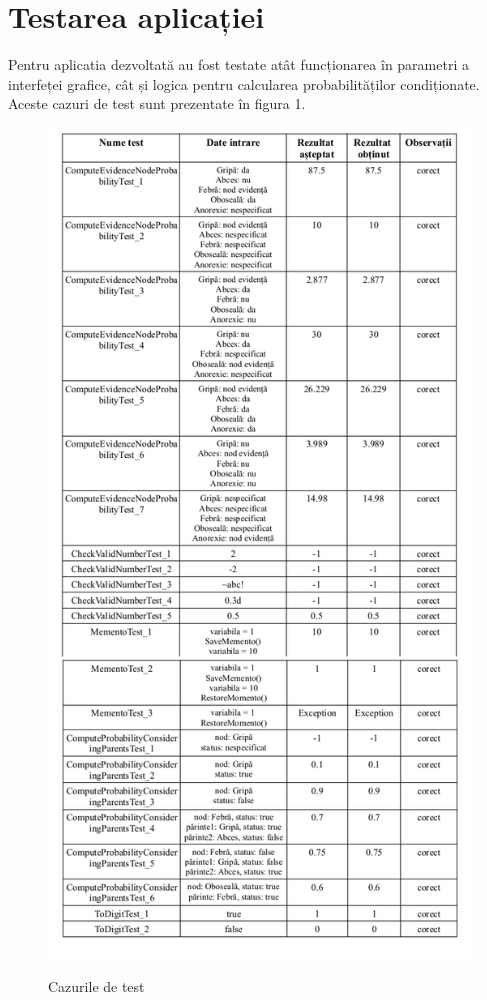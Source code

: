 \documentclass[12pt]{article}
\begin{document}
\section{Testarea aplicației}
Pentru aplicatia dezvoltată au fost testate atât funcționarea în parametri	 a interfeței grafice, cât și logica pentru calcularea probabilităților condiționate. 
Aceste cazuri de test sunt prezentate în figura 1.
\begin{figure}[!h]
	\centering
	\includegraphics[scale=0.38]{raport}
	\label{fig:testCases}
	\caption{Cazurile de test}
\end{figure}
\end{document}
